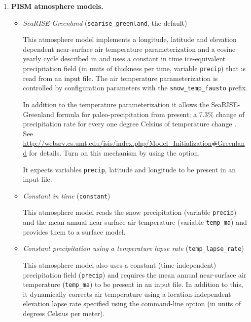 \begin{enumerate}
\item \textbf{PISM atmosphere models.}
\begin{itemize}
  \item \emph{SeaRISE-Greenland} (\texttt{searise_greenland}, the default)

    This atmosphere model implements a longitude, latitude and elevation dependent near-surface air temperature parameterization and a cosine yearly cycle described in \cite{Faustoetal2009} and uses a constant in time ice-equivalent precipitation field (in units of thickness per time, variable \texttt{precip}) that is read from an input file.  The air temperature parameterization is controlled by configuration parameters with the \texttt{snow_temp_fausto} prefix.

    In addition to the temperature parameterization it allows the SeaRISE-Greenland formula for paleo-precipitation from present; a 7.3\% change of precipitation rate for every one degree Celsius of temperature change \cite{Huybrechts02}.  See \url{http://websrv.cs.umt.edu/isis/index.php/Model_Initialization#Greenland} for details.  Turn on this mechanism by using the  option.

    It expects variables \texttt{precip}, latitude and longitude to be present in an input file.

 \item \emph{Constant in time} (\texttt{constant})

    This atmosphere model reads the snow precipitation (variable \texttt{precip}) and the mean annual near-surface air temperature (variable \texttt{temp_ma}) and provides them to a surface model.
  \item \emph{Constant precipitation using a temperature lapse rate} (\texttt{temp_lapse_rate})
    
    This atmosphere model also uses a constant (time-independent) precipitation field (\texttt{precip}) and requires the mean annual near-surface air temperature (\texttt{temp_ma}) to be present in an input file. In addition to this, it dynamically corrects air temperature using a location-independent elevation lapse rate specified using the  command-line option (in units of degrees Celsius per meter).
 \end{itemize}


\end{enumerate}
